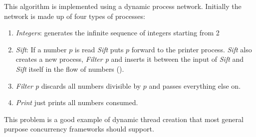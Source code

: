\documentclass[12pt,twoside,notitlepage]{report}
\theoremstyle{plain}%
\theoremstyle{definition}
\theoremstyle{remark}
\begin{document}
This algorithm is implemented using a dynamic process network. Initially the network is made up of four types of processes:
\begin{enumerate}
\item{\textit{Integers}: generates the infinite sequence of integers starting from 2}
\item{\textit{Sift}: If a number $ p $ is read \textit{Sift} puts $ p $ forward to the printer process. \textit{Sift} also creates a new process, \textit{Filter p}  and inserts it between the input of \textit{Sift} and \textit{Sift} itself in the flow of numbers (). }
\item{\textit{Filter p}  discards all numbers divisible by $ p $ and passes everything else on.}
\item{\textit{Print} just prints all numbers consumed.}
\end{enumerate}

This problem is a good example of dynamic thread creation that most general purpose concurrency frameworks should support.
\end{document}
